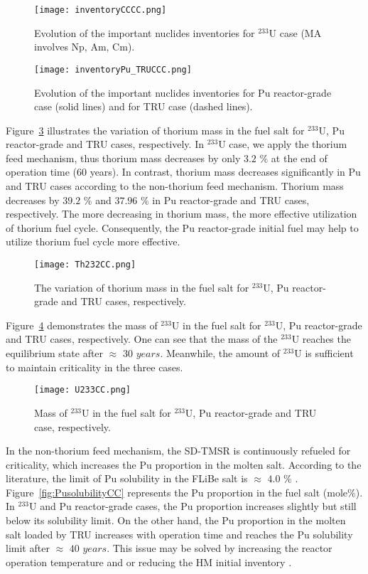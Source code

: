 \begin{figure}
	\centering
	\texttt{[image: inventoryCCCC.png]}
	\caption{Evolution of the important nuclides inventories for $^{233}$U case (MA involves Np, Am, Cm).}
	\label{fig:inventoryCCCC}
\end{figure}

\begin{figure}
	\centering
	\texttt{[image: inventoryPu\_TRUCCC.png]}
	\caption{Evolution of the important nuclides inventories for Pu reactor-grade case (solid lines) and for TRU case (dashed lines).}
	\label{fig:inventoryPu_TRUCCC}
\end{figure}


Figure~\ref{fig:Th232CC} illustrates the variation of thorium mass in the fuel salt for $^{233}$U, Pu reactor-grade and TRU cases, respectively. In $^{233}$U case, we apply the thorium feed mechanism, thus thorium mass decreases by only $3.2$ $\%$ at the end of operation time (60 years). In contrast, thorium mass decreases significantly in Pu and TRU cases according to the non-thorium feed mechanism. Thorium mass decreases by $39.2$ $\%$ and $37.96$ $\%$ in Pu reactor-grade and TRU cases, respectively. The more decreasing in thorium mass, the more effective utilization of thorium fuel cycle. Consequently, the Pu reactor-grade initial fuel may help to utilize thorium fuel cycle more effective.

\begin{figure}
	\centering
	\texttt{[image: Th232CC.png]}
	\caption{The variation of thorium mass in the fuel salt for $^{233}$U, Pu reactor-grade and TRU cases, respectively.}
	\label{fig:Th232CC}
\end{figure}

Figure~\ref{fig:U233CC} demonstrates the mass of $^{233}$U in the fuel salt for $^{233}$U, Pu reactor-grade and TRU cases, respectively. One can see that the mass of the $^{233}$U reaches the equilibrium state after $\approx$ $30$ $years$. Meanwhile, the amount of $^{233}$U is sufficient to maintain criticality in the three cases.

\begin{figure}
	\centering
	\texttt{[image: U233CC.png]}
	\caption{Mass of $^{233}$U in the fuel salt for $^{233}$U, Pu reactor-grade and TRU case, respectively.}
	\label{fig:U233CC}
\end{figure}

In the non-thorium feed mechanism, the SD-TMSR is continuously refueled for criticality, which increases the Pu proportion in the molten salt. According to the literature, the limit of Pu solubility in the FLiBe salt is $\approx$ $4.0$ $\%$ \cite{ignatiev2012progress,sood1975plutonium}. Figure~\ref{fig:PusolubilityCC} represents the Pu proportion in the fuel salt (mole\%). In $^{233}$U and Pu reactor-grade cases, the Pu proportion increases slightly but still below its solubility limit. On the other hand, the Pu proportion in the molten salt loaded by TRU increases with operation time and reaches the Pu solubility limit after $\approx$ $40$ $years$. This issue may be solved by increasing the reactor operation temperature and or reducing the HM initial inventory \cite{zou2018transition}.


